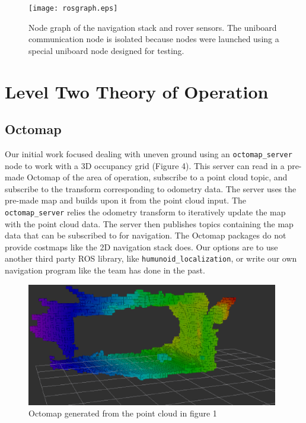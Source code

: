 \documentclass[10pt, oneside,onecolumn]{IEEEtran}
\begin{document}
\begin{figure}
\centering
\texttt{[image: rosgraph.eps]}
\caption{Node graph of the navigation stack and rover sensors. The uniboard communication node is isolated because nodes were launched using a special uniboard node designed for testing.}
\end{figure}


\section{Level Two Theory of Operation}
\subsection{Octomap}
Our initial work focused dealing with uneven ground using an \texttt{octomap\_server} node to work with a 3D occupancy grid (Figure 4). This server can read in a pre-made Octomap of the area of operation, subscribe to a point cloud topic, and subscribe to the transform corresponding to odometry data. The server uses the pre-made map and builds upon it from the point cloud input. The \texttt{octomap\_server} relies the odometry transform to iteratively update the map with the point cloud data. The server then publishes topics containing the map data that can be subscribed to for navigation. The Octomap packages do not provide costmaps like the 2D navigation stack does. Our options are to use another third party ROS library, like \texttt{humunoid\_localization}, or write our own navigation program like the team has done in the past. 

\begin{figure}[H]
\centering
\includegraphics[width=110mm]{newoctomap.eps}
\caption{Octomap generated from the point cloud in figure 1\label{overflow}}
\end{figure}
\end{document}
